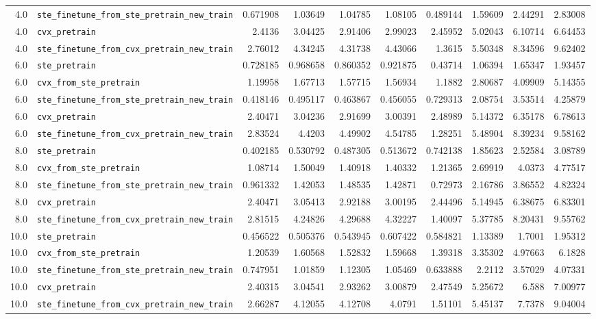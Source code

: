 \begin{longtable}{@{}r l *{8}{r}@{}}
4.0 & \texttt{ste\_finetune\_from\_ste\_pretrain\_new\_train} & 0.671908 & 1.03649 & 1.04785 & 1.08105 & 0.489144 & 1.59609 & 2.44291 & 2.83008 \\
4.0 & \texttt{cvx\_pretrain} & 2.4136 & 3.04425 & 2.91406 & 2.99023 & 2.45952 & 5.02043 & 6.10714 & 6.64453 \\
4.0 & \texttt{ste\_finetune\_from\_cvx\_pretrain\_new\_train} & 2.76012 & 4.34245 & 4.31738 & 4.43066 & 1.3615 & 5.50348 & 8.34596 & 9.62402 \\
6.0 & \texttt{ste\_pretrain} & 0.728185 & 0.968658 & 0.860352 & 0.921875 & 0.43714 & 1.06394 & 1.65347 & 1.93457 \\
6.0 & \texttt{cvx\_from\_ste\_pretrain} & 1.19958 & 1.67713 & 1.57715 & 1.56934 & 1.1882 & 2.80687 & 4.09909 & 5.14355 \\
6.0 & \texttt{ste\_finetune\_from\_ste\_pretrain\_new\_train} & 0.418146 & 0.495117 & 0.463867 & 0.456055 & 0.729313 & 2.08754 & 3.53514 & 4.25879 \\
6.0 & \texttt{cvx\_pretrain} & 2.40471 & 3.04236 & 2.91699 & 3.00391 & 2.48989 & 5.14372 & 6.35178 & 6.78613 \\
6.0 & \texttt{ste\_finetune\_from\_cvx\_pretrain\_new\_train} & 2.83524 & 4.4203 & 4.49902 & 4.54785 & 1.28251 & 5.48904 & 8.39234 & 9.58162 \\
8.0 & \texttt{ste\_pretrain} & 0.402185 & 0.530792 & 0.487305 & 0.513672 & 0.742138 & 1.85623 & 2.52584 & 3.08789 \\
8.0 & \texttt{cvx\_from\_ste\_pretrain} & 1.08714 & 1.50049 & 1.40918 & 1.40332 & 1.21365 & 2.69919 & 4.0373 & 4.77517 \\
8.0 & \texttt{ste\_finetune\_from\_ste\_pretrain\_new\_train} & 0.961332 & 1.42053 & 1.48535 & 1.42871 & 0.72973 & 2.16786 & 3.86552 & 4.82324 \\
8.0 & \texttt{cvx\_pretrain} & 2.40471 & 3.05413 & 2.92188 & 3.00195 & 2.44496 & 5.14945 & 6.38675 & 6.83301 \\
8.0 & \texttt{ste\_finetune\_from\_cvx\_pretrain\_new\_train} & 2.81515 & 4.24826 & 4.29688 & 4.32227 & 1.40097 & 5.37785 & 8.20431 & 9.55762 \\
10.0 & \texttt{ste\_pretrain} & 0.456522 & 0.505376 & 0.543945 & 0.607422 & 0.584821 & 1.13389 & 1.7001 & 1.95312 \\
10.0 & \texttt{cvx\_from\_ste\_pretrain} & 1.20539 & 1.60568 & 1.52832 & 1.59668 & 1.39318 & 3.35302 & 4.97663 & 6.1828 \\
10.0 & \texttt{ste\_finetune\_from\_ste\_pretrain\_new\_train} & 0.747951 & 1.01859 & 1.12305 & 1.05469 & 0.633888 & 2.2112 & 3.57029 & 4.07331 \\
10.0 & \texttt{cvx\_pretrain} & 2.40315 & 3.04541 & 2.93262 & 3.00879 & 2.47549 & 5.25672 & 6.588 & 7.00977 \\
10.0 & \texttt{ste\_finetune\_from\_cvx\_pretrain\_new\_train} & 2.66287 & 4.12055 & 4.12708 & 4.0791 & 1.51101 & 5.45137 & 7.7378 & 9.04004 \\
\end{longtable}

